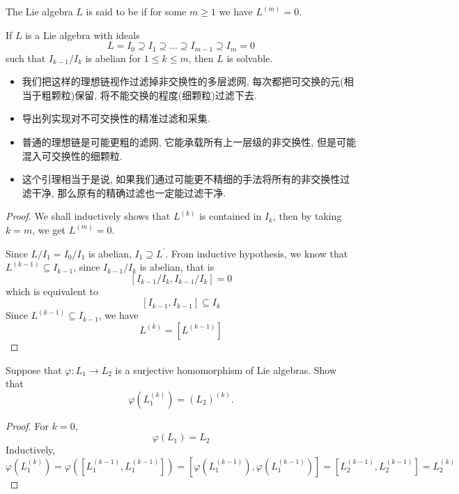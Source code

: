 \documentclass[../main.tex]{subfiles}
\begin{document}
\begin{definition}{}{}
The Lie algebra $L$ is said to be  if for some $m \geq 1$ we have $L^{(m)} = 0$.
\end{definition}
\begin{lemma}{}{}
If $L$ is a Lie algebra with ideals
\[
L = I_0 \supseteq I_1 \supseteq \ldots \supseteq I_{m-1} \supseteq I_m = 0
\]
such that $I_{k-1}/I_k$ is abelian for $1 \leq k \leq m$, then $L$ is solvable. 
\end{lemma}
\begin{note}
    \begin{itemize}
        \item 我们把这样的理想链视作过滤掉非交换性的多层滤网, 每次都把可交换的元(相当于粗颗粒)保留, 将不能交换的程度(细颗粒)过滤下去.
        \item 导出列实现对不可交换性的精准过滤和采集.
        \item 普通的理想链是可能更粗的滤网, 它能承载所有上一层级的非交换性, 但是可能混入可交换性的细颗粒.
        \item 这个引理相当于是说, 如果我们通过可能更不精细的手法将所有的非交换性过滤干净, 那么原有的精确过滤也一定能过滤干净.
    \end{itemize}
    
\end{note}
\begin{proof}
    We shall inductively shows that \(  L^{\left( k \right) }  \) is contained in \(  I_{k}  \), then by taking \(  k= m  \), we get \(  L^{\left( m \right) }= 0  \).
    
    
    Since \(  L/I_1= I_0/I_1  \) is abelian, \(  I_1\supseteq L^{\prime}   \).  
     From inductive hypothesis, we know that \(  L^{\left( k -1\right) }\subseteq I_{k-1}  \), since \(  I_{k-1}/ I_{k}  \) is abelian, that is \[
     [I_{k-1}/I_{k},I_{k-1}/I_{k}]= 0
     \] which is equivalent to \[
     [I_{k-1},I_{k-1}]\subseteq I_{k}
     \]Since \(  L^{\left( k-1 \right) }\subseteq I_{k-1}  \), we have \[
     L^{\left( k \right) }= [L^{\left( k-1 \right) }]
     \] 
\end{proof}

\begin{proposition}{}{}
    Suppose that $\varphi : L_1 \to L_2$ is a surjective homomorphism of Lie algebras. Show that
\[
\varphi(L_1^{(k)}) = (L_2)^{(k)}.
\]
\end{proposition}

\begin{proof}
   For \(  k= 0  \),  \[
    \varphi \left( L_1 \right)= L_2 
   \] Inductively,  \[
    \varphi \left( L_{1}^{\left( k \right) } \right)=  \varphi \left( \left[ L_1^{\left( k-1 \right) },L_1^{\left( k-1 \right) } \right]  \right)= \left[  \varphi \left( L_1^{\left( k-1 \right) } \right),  \varphi \left( L_1^{\left( k-1 \right) } \right)   \right]   = \left[ L_2^{\left( k-1 \right) },L_2^{\left( k-1 \right) } \right]= L_2^{\left( k \right) } 
     \]
\end{proof}
\end{document}
